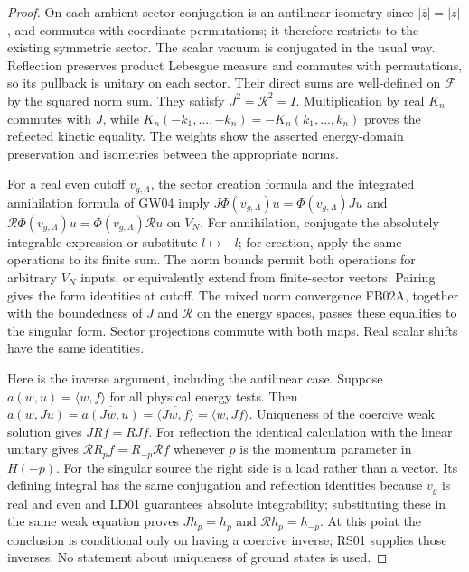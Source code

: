 \documentclass[11pt,a4paper]{article}
\theoremstyle{remark}\newtheorem{remark}[theorem]{Remark}
\newcommand{\F}{\mathcal F}\newcommand{\Q}{\mathcal Q}\newcommand{\HH}{\mathcal H}
\begin{document}
\begin{proof}
On each ambient sector conjugation is an antilinear isometry since $|\overline z|=|z|$, and commutes with coordinate permutations; it therefore restricts to the existing symmetric sector. The scalar vacuum is conjugated in the usual way. Reflection preserves product Lebesgue measure and commutes with permutations, so its pullback is unitary on each sector. Their direct sums are well-defined on $\F$ by the squared norm sum. They satisfy $J^2=\mathcal R^2=I$. Multiplication by real $K_n$ commutes with $J$, while $K_n(-k_1,\ldots,-k_n)=-K_n(k_1,\ldots,k_n)$ proves the reflected kinetic equality. The weights show the asserted energy-domain preservation and isometries between the appropriate norms.

For a real even cutoff $v_{g,\Lambda}$, the sector creation formula and the integrated annihilation formula of GW04 imply
$J\Phi(v_{g,\Lambda})u=\Phi(v_{g,\Lambda})Ju$ and
$\mathcal R\Phi(v_{g,\Lambda})u=\Phi(v_{g,\Lambda})\mathcal Ru$ on $V_N$.
For annihilation, conjugate the absolutely integrable expression or substitute $l\mapsto-l$; for creation, apply the same operations to its finite sum. The norm bounds permit both operations for arbitrary $V_N$ inputs, or equivalently extend from finite-sector vectors. Pairing gives the form identities at cutoff. The mixed norm convergence FB02A, together with the boundedness of $J$ and $\mathcal R$ on the energy spaces, passes these equalities to the singular form. Sector projections commute with both maps. Real scalar shifts have the same identities.

Here is the inverse argument, including the antilinear case. Suppose $a(w,u)=\langle w,f\rangle$ for all physical energy tests. Then
$a(w,Ju)=\overline{a(Jw,u)}=\overline{\langle Jw,f\rangle}=\langle w,Jf\rangle$.
Uniqueness of the coercive weak solution gives $J Rf=R Jf$. For reflection the identical calculation with the linear unitary gives $\mathcal R R_pf=R_{-p}\mathcal R f$ whenever $p$ is the momentum parameter in $H(-p)$. For the singular source the right side is a load rather than a vector. Its defining integral has the same conjugation and reflection identities because $v_g$ is real and even and LD01 guarantees absolute integrability; substituting these in the same weak equation proves $Jh_p=h_p$ and $\mathcal Rh_p=h_{-p}$. At this point the conclusion is conditional only on having a coercive inverse; RS01 supplies those inverses. No statement about uniqueness of ground states is used.
\end{proof}
\end{document}

